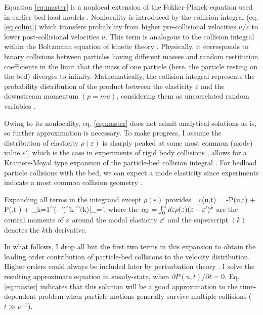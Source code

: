 Equation \ref{eq:master} is a nonlocal extension of the Fokker-Planck equation used in earlier bed load models \citep{Fan2014,Ancey2014}. 
Nonlocality is introduced by the collision integral (eq. \ref{eq:colint}) which transfers probability from higher pre-collisional velocities $u/\varepsilon$ to lower post-collisional velocities $u$.
This term is analogous to the collision integral within the Boltzmann equation of kinetic theory \citep{Duderstadt1979, Brilliantov2004}. Physically, it corresponds to binary collisions between particles having different masses and random restitution coefficients \citep[cf.][]{Serero2015} in the limit that the mass of one particle (here, the particle resting on the bed) diverges to infinity.
Mathematically, the collision integral represents the probability distribution of the product between the elasticity $\varepsilon$ and the downstream momentum $(p = m u)$, considering them as uncorrelated random variables \citep[cf.][]{Feller1968}.


Owing to its nonlocality, eq. \ref{eq:master} does not admit analytical solutions as is, so further approximation is necessary.
To make progress, I assume the distribution of elasticity $\rho(\varepsilon)$ is sharply peaked at some most common (mode) value $\varepsilon'$, which is the case in experiments of rigid body collisions \citep{Glielmo2014}, allows for a Kramers-Moyal type expansion of the particle-bed collision integral \citep{Gardiner1983}.
For bedload particle collisions with the bed, we can expect a mode elasticity since experiments indicate a most common collision geometry \citep[e.g.][]{Gordon1972,Martin2013}.

Expanding all terms in the integrand except $\rho(\varepsilon)$ provides
\be {}_c(u,t) = -P(u,t) + P\big(,t \big) + \sum_{k=1}^\infty {}(\ve - \ve')^k ^{(k)}\Big|_{\ve=\ve'},\label{eq:expansion}\ee
where the $\alpha_k = \int_0^1 d\varepsilon \rho(\varepsilon) (\varepsilon-\varepsilon')^k $ are the central moments of $\varepsilon$ around the modal elasticity $\varepsilon'$ and the superscript $(k)$ denotes the $k$th derivative.

In what follows, I drop all but the first two terms in this expansion to obtain the leading order contribution of particle-bed collisions to the velocity distribution.
Higher orders could always be included later by perturbation theory \citep{Morse1953}.
I solve the resulting approximate equation in steady-state, when $\partial P(u,t)/\partial t = 0$. Eq. \ref{eq:master} indicates that this solution will be a good approximation to the time-dependent problem when particle motions generally survive multiple collisions ($t\gg \nu^{-1}$).


